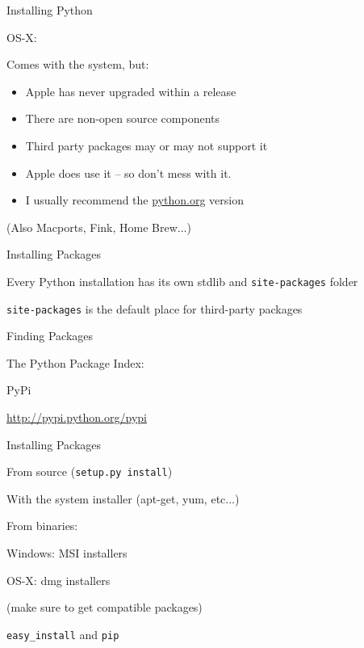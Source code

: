 \documentclass{beamer}
\begin{document}
\begin{frame}[fragile]{Installing Python}

{\Large OS-X:}

Comes with the system, but:
\begin{itemize}
    \item Apple has never upgraded within a release
    \item There are non-open source components
    \item Third party packages may or may not support it
    \item Apple does use it -- so don't mess with it.
    \item I usually recommend the \url{python.org} version
\end{itemize}
(Also Macports, Fink, Home Brew...)

\vfill
\end{frame} 

\begin{frame}[fragile]{Installing Packages}

{\Large Every Python installation has its own stdlib and \verb|site-packages| folder}

\vfill
{\Large\verb|site-packages| is the default place for third-party packages}

\end{frame} 

\begin{frame}[fragile]{Finding Packages}

{\Large The Python Package Index:}

\vfill
{\LARGE PyPi}

\vfill
\url{http://pypi.python.org/pypi}

\end{frame} 

\begin{frame}[fragile]{Installing Packages}

{\Large From source}
(\verb|setup.py install|)

\vfill
{\Large With the system installer (apt-get, yum, etc...)}

\vfill
{\Large From binaries: }

\vfill
{\Large Windows:} MSI installers

\vfill
{\Large OS-X:} dmg installers 

(make sure to get compatible packages)

\vfill
{\Large \verb|easy_install| and \verb|pip|}

\end{frame} 
\end{document}

